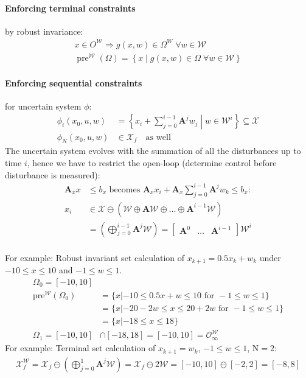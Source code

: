 \documentclass[landscape,a4paper,8pt]{scrartcl}
\renewcommand{\implies}{\Rightarrow}
\newcommand{\mc}[1]{\mathcal{#1}}
\newcommand\vA{\bm{A}}
\newcommand{\Me}[1]{\begin{bmatrix}#1\end{bmatrix}} %
\DeclareMathOperator\pre{pre}
\begin{document}
\begin{multicols*}{3}
\paragraph{Enforcing terminal constraints} by robust invariance:
\begin{align*}
x \in O^{\mc W} \implies g(x, w) \in \Omega^W \; \forall w \in \mc W \\
\pre^{\mc W}(\Omega) = \left\{ x \middle| g(x, w) \in \Omega \; \forall w \in \mc W\right\}
\end{align*}

\paragraph{Enforcing sequential constraints} for uncertain system $\phi$:\\
\begin{align*}
\phi_i(x_0, u, w) & = \left\{ x_i + \sum_{j=0}^{i-1}\vA^j w_j \middle| w \in \mc W^i \right\} \subseteq \mc X \\
\phi_N(x_0, u, w) & \in \mc X_f \quad\text{as well}
\end{align*}
The uncertain system evolves with the summation of all the disturbances up to time $i$, hence we have to restrict the open-loop (determine control before disturbance is measured):
\begin{align*}
\vA_x x & \leq b_x \text{ becomes } \vA_x x_i + \vA_x \sum_{j=0}^{i-1}\vA^j w_k \leq b_x: \\
x_i & \in \mc X \ominus \left(\mc W \oplus \vA\mc W \oplus \dots \oplus \vA^{i-1}\mc W\right) \\
    & = \left(\bigoplus_{j=0}^{i-1}\vA^j\mc W\right) = \Me{\vA^0 & \dots & \vA^{i-1}}\mc W^i \\
\end{align*}

For example: Robust invariant set calculation of $x_{k+1} = 0.5x_k + w_k$ under $-10 \le x \le 10$ and $-1 \le w \le 1$.
\begin{align*}
\Omega_0 = [-10, 10] \\
	\text{pre}^\mc{W} (\Omega_0) &= \{x | -10 \le 0.5x + w \le 10 \text{ for } -1 \le w \le 1 \} \\
	&= \{x | -20 -2w \le x \le 20 + 2w \text{ for } -1 \le w \le 1 \} \\
	&= \{x | -18 \le x \le 18 \}\\
		\Omega_1 = [-10, 10] &\cap [-18, 18] = [-10, 10] = \mc O_\infty^{\mc W}
\end{align*}
For example: Terminal set calculation of $x_{k+1} = w_k$, $-1 \le w \le 1$, N$= 2$:
\begin{align*}
 \mc X_f^\mc W =  \mc X_f \ominus \left(\bigoplus_{j=0}^{1}\vA^j\mc W\right) = \mc X_f \ominus 2 \mc W = [-10, 10] \ominus [-2, 2] = [-8, 8]
\end{align*}

\end{multicols*}
\end{document}
